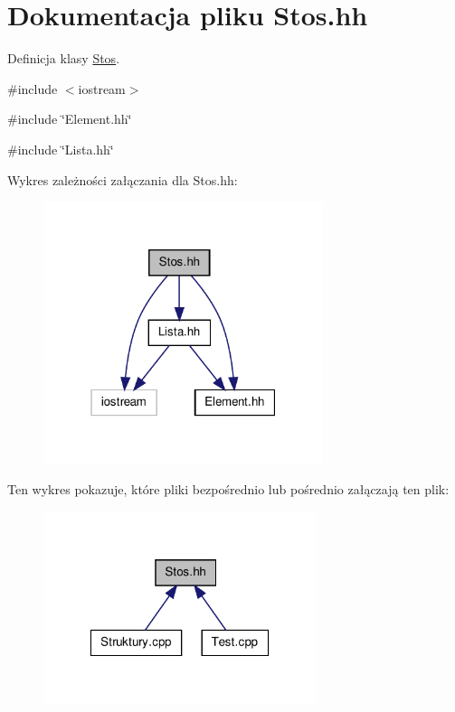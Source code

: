 \hypertarget{_stos_8hh}{
\section{Dokumentacja pliku Stos.hh}
\label{_stos_8hh}
}


Definicja klasy \hyperlink{class_stos}{Stos}.  


{\ttfamily \#include $<$iostream$>$}\par
{\ttfamily \#include \char`\"{}Element.hh\char`\"{}}\par
{\ttfamily \#include \char`\"{}Lista.hh\char`\"{}}\par
Wykres zależności załączania dla Stos.hh:
\nopagebreak
\begin{figure}[H]
\begin{center}
\leavevmode
\includegraphics[width=232pt]{_stos_8hh__incl}
\end{center}
\end{figure}
Ten wykres pokazuje, które pliki bezpośrednio lub pośrednio załączają ten plik:
\nopagebreak
\begin{figure}[H]
\begin{center}
\leavevmode
\includegraphics[width=226pt]{_stos_8hh__dep__incl}
\end{center}
\end{figure}
